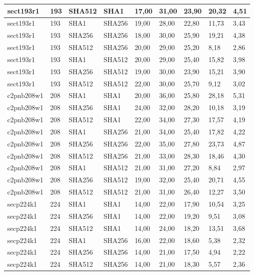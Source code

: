 \begin{longtable}{| l | l | l | l | l |l |l |l |l |}
sect193r1 & 193 & SHA512 & SHA1 & 17,00 & 31,00 & 23,90 & 20,32 & 4,51 \\ \hline 
sect193r1 & 193 & SHA1 & SHA256 & 19,00 & 28,00 & 22,80 & 11,73 & 3,43 \\ \hline 
sect193r1 & 193 & SHA256 & SHA256 & 18,00 & 30,00 & 25,90 & 19,21 & 4,38 \\ \hline 
sect193r1 & 193 & SHA512 & SHA256 & 20,00 & 29,00 & 25,20 & 8,18 & 2,86 \\ \hline 
sect193r1 & 193 & SHA1 & SHA512 & 20,00 & 29,00 & 25,40 & 15,82 & 3,98 \\ \hline 
sect193r1 & 193 & SHA256 & SHA512 & 19,00 & 30,00 & 23,90 & 15,21 & 3,90 \\ \hline 
sect193r1 & 193 & SHA512 & SHA512 & 22,00 & 30,00 & 25,70 & 9,12 & 3,02 \\ \hline 
c2pnb208w1 & 208 & SHA1 & SHA1 & 20,00 & 36,00 & 25,80 & 28,18 & 5,31 \\ \hline 
c2pnb208w1 & 208 & SHA256 & SHA1 & 24,00 & 32,00 & 28,20 & 10,18 & 3,19 \\ \hline 
c2pnb208w1 & 208 & SHA512 & SHA1 & 22,00 & 34,00 & 27,30 & 17,57 & 4,19 \\ \hline 
c2pnb208w1 & 208 & SHA1 & SHA256 & 21,00 & 34,00 & 25,40 & 17,82 & 4,22 \\ \hline 
c2pnb208w1 & 208 & SHA256 & SHA256 & 22,00 & 35,00 & 27,80 & 23,73 & 4,87 \\ \hline 
c2pnb208w1 & 208 & SHA512 & SHA256 & 21,00 & 33,00 & 28,30 & 18,46 & 4,30 \\ \hline 
c2pnb208w1 & 208 & SHA1 & SHA512 & 21,00 & 31,00 & 27,20 & 8,84 & 2,97 \\ \hline 
c2pnb208w1 & 208 & SHA256 & SHA512 & 19,00 & 32,00 & 25,40 & 20,71 & 4,55 \\ \hline 
c2pnb208w1 & 208 & SHA512 & SHA512 & 21,00 & 31,00 & 26,40 & 12,27 & 3,50 \\ \hline 
secp224k1 & 224 & SHA1 & SHA1 & 14,00 & 22,00 & 17,90 & 10,54 & 3,25 \\ \hline 
secp224k1 & 224 & SHA256 & SHA1 & 14,00 & 22,00 & 19,20 & 9,51 & 3,08 \\ \hline 
secp224k1 & 224 & SHA512 & SHA1 & 14,00 & 24,00 & 18,20 & 13,51 & 3,68 \\ \hline 
secp224k1 & 224 & SHA1 & SHA256 & 16,00 & 22,00 & 18,60 & 5,38 & 2,32 \\ \hline 
secp224k1 & 224 & SHA256 & SHA256 & 14,00 & 21,00 & 17,50 & 4,94 & 2,22 \\ \hline 
secp224k1 & 224 & SHA512 & SHA256 & 14,00 & 21,00 & 18,30 & 5,57 & 2,36 \\ \hline 

\end{longtable}
